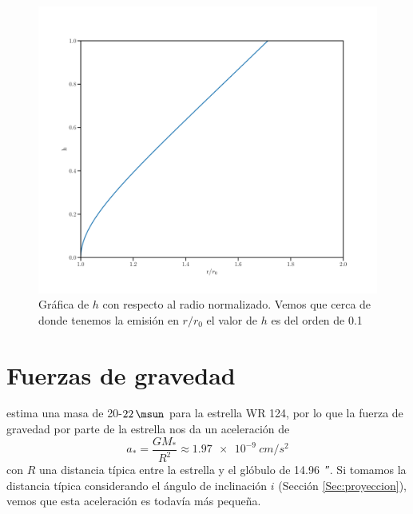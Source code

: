 \documentclass{book}
\begin{document}
\begin{figure}
    \centering
    \includegraphics[width=\textwidth]{imagenes_corregidas/h.pdf}
    \caption{Gráfica de $h$ con respecto al radio normalizado. Vemos que cerca de donde tenemos la emisión en $r/r_0$ el valor de $h$ es del orden de 0.1}
    \label{fig:h}
\end{figure}

\section{Fuerzas de gravedad} \label{F gravedad}

\cite{Hamann:2019} estima una masa  de 20-$\SI{22}{\msun}$ para la estrella WR 124, por lo que la fuerza de gravedad por parte de la estrella nos da un aceleración de 
\begin{equation}
a_*=\frac{GM_*}{R^2}\approx \SI{1.97e-9}{cm/s^2}
\end{equation}
con $R$ una distancia típica entre la estrella y el glóbulo de \SI{14.96}{\arcsecond}. Si tomamos la distancia típica considerando el ángulo de inclinación $i$ (Sección \ref{Sec:proyeccion}), vemos que esta aceleración es todavía más pequeña.
\end{document}
